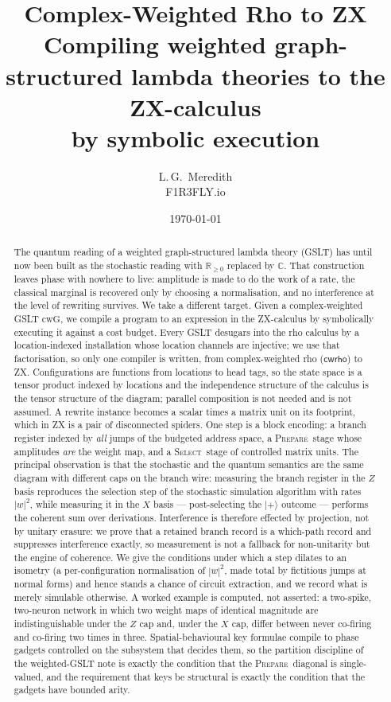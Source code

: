 \documentclass[11pt]{article}
\title{\bfseries Complex-Weighted Rho to ZX\\[2pt]
\large Compiling weighted graph-structured lambda theories to the ZX-calculus\\
by symbolic execution}
\author{L.\,G.~Meredith\\\small F1R3FLY.io}
\date{\today}
\theoremstyle{definition}
\theoremstyle{plain}
\newcommand{\PREP}{\textsc{Prepare}}
\newcommand{\SEL}{\textsc{Select}}
\newcommand{\ket}[1]{| #1 \rangle}
\newcommand{\cwrho}{\textsf{cwrho}}
\newcommand{\cwG}{\mathrm{cwG}}
\begin{document}
\maketitle

\begin{abstract}
The quantum reading of a weighted graph-structured lambda theory (GSLT) has until now been
built as the stochastic reading with $\mathbb{R}_{\geq 0}$ replaced by $\mathbb{C}$. That
construction leaves phase with nowhere to live: amplitude is made to do the work of a rate,
the classical marginal is recovered only by choosing a normalisation, and no interference at
the level of rewriting survives. We take a different target. Given a complex-weighted GSLT
$\cwG$, we compile a program to an expression in the ZX-calculus by symbolically executing it
against a cost budget. Every GSLT desugars into the rho calculus by a location-indexed
installation whose location channels are injective; we use that factorisation, so only one
compiler is written, from complex-weighted rho ($\cwrho$) to ZX. Configurations are functions
from locations to head tags, so the state space is a tensor product indexed by locations and
the independence structure of the calculus is the tensor structure of the diagram; parallel
composition is not needed and is not assumed. A rewrite instance becomes a scalar times a
matrix unit on its footprint, which in ZX is a pair of disconnected spiders. One step is a
block encoding: a branch register indexed by \emph{all} jumps of the budgeted address space,
a \PREP\ stage whose amplitudes \emph{are} the weight map, and a \SEL\ stage of controlled
matrix units. The principal observation is that the stochastic and the quantum semantics are
the same diagram with different caps on the branch wire: measuring the branch register in the
$Z$ basis reproduces the selection step of the stochastic simulation algorithm with rates
$|w|^2$, while measuring it in the $X$ basis --- post-selecting the $\ket{+}$ outcome ---
performs the coherent sum over derivations. Interference is therefore effected by projection,
not by unitary erasure: we prove that a retained branch record is a which-path record and
suppresses interference exactly, so measurement is not a fallback for non-unitarity but the
engine of coherence. We give the conditions under which a step dilates to an isometry
(a per-configuration normalisation of $|w|^2$, made total by fictitious jumps at normal
forms) and hence stands a chance of circuit extraction, and we record what is merely
simulable otherwise. A worked example is computed, not asserted: a two-spike, two-neuron
network in which two weight maps of identical magnitude are indistinguishable
under the $Z$ cap and, under the $X$ cap, differ between never co-firing and
co-firing two times in three. Spatial-behavioural key formulae compile to phase
gadgets controlled on the subsystem that decides them, so the partition discipline of the weighted-GSLT note is
exactly the condition that the \PREP\ diagonal is single-valued, and the requirement that
keys be structural is exactly the condition that the gadgets have bounded arity.
\end{abstract}
\end{document}
